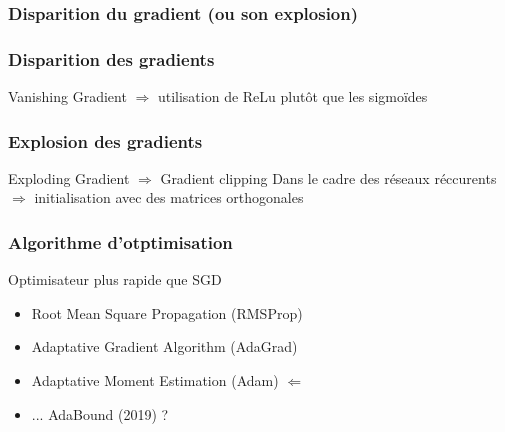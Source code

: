 \begin{frame}
  \frametitle{Disparition du gradient (ou son explosion)}
\end{frame}

\begin{frame}
  \frametitle{Disparition des gradients}
  Vanishing Gradient $\Rightarrow$ utilisation de ReLu plutôt que les sigmoïdes
\end{frame}

\begin{frame}
  \frametitle{Explosion des gradients}
  Exploding Gradient $\Rightarrow$ Gradient clipping
  Dans le cadre des réseaux réccurents $\Rightarrow$ initialisation avec des matrices orthogonales
\end{frame}

\begin{frame}
  \frametitle{Algorithme d'otptimisation}
  Optimisateur plus rapide que SGD
  \begin{itemize}
  \item Root Mean Square Propagation (RMSProp)
  \item Adaptative Gradient Algorithm (AdaGrad)
  \item Adaptative Moment Estimation (Adam)    $\Leftarrow$
  \item ... AdaBound (2019) ?
 \end{itemize}
\end{frame}
